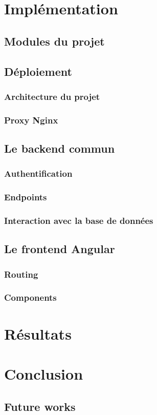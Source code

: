 \documentclass[11pt,a4paper]{report}
\begin{document}
\chapter{Implémentation}
\section{Modules du projet}
\section{Déploiement}
\subsection{Architecture du projet}
\subsection{Proxy Nginx}
\section{Le backend commun}
\subsection{Authentification}
\subsection{Endpoints}
\subsection{Interaction avec la base de données}
\section{Le frontend Angular}
\subsection{Routing}
\subsection{Components}
\chapter{Résultats}
\chapter{Conclusion}
\section{Future works}


\end{document}
